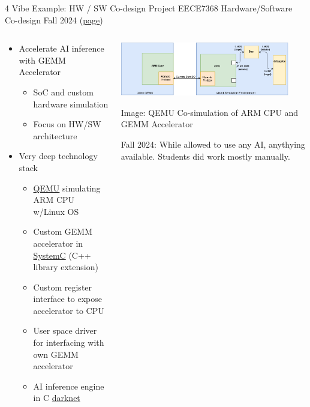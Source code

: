 \documentclass[xcolor={dvipsnames,table}, aspectratio=169]{beamer}
\begin{document}
\begin{frame}{4 Vibe Example: HW / SW Co-design Project} 
    \centering EECE7368 Hardware/Software Co-design Fall 2024 (\href{https://neu-ece-7368.github.io/}{page})   \begin{columns}[T]
    \begin{column}{0.4\textwidth}
      \begin{itemize}
        \item Accelerate AI inference with GEMM Accelerator 
        \begin{itemize}
          \item SoC and custom hardware simulation
          \item Focus on HW/SW architecture
        \end{itemize}
        \item Very deep technology stack
        \begin{itemize}\footnotesize
            \item \href{https://www.qemu.org/}{QEMU} simulating ARM CPU w/Linux OS
            \item Custom GEMM accelerator in \href{https://systemc.org/}{SystemC} (C++ library extension)
            \item Custom register interface to expose accelerator to CPU 
            \item User space driver for interfacing with own GEMM accelerator
            \item AI inference engine in C \href{https://github.com/pjreddie/darknet}{darknet}
          \end{itemize}
      \end{itemize}
    \end{column}
    \begin{column}{0.6\textwidth}
      \hfill \includegraphics[width=0.9\textwidth]{images/QemuCosim.png}
      \tiny\centerline{Image: QEMU Co-simulation of ARM CPU and GEMM Accelerator}

      \begin{alertbox}
        Fall 2024: While allowed to use any AI, anythying available. Students did work mostly manually. 
      \end{alertbox}
    \end{column}
  \end{columns}
\end{frame}
\end{document}
